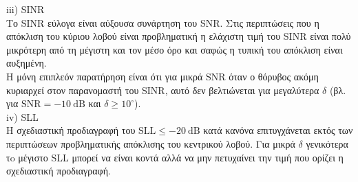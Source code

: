 \documentclass[12pt]{article} \usepackage{mathtools}
\begin{document}
iii) SINR \\
Το SINR εύλογα είναι αύξουσα συνάρτηση του SNR. Στις περιπτώσεις που η απόκλιση του κύριου λοβού είναι προβληματική η ελάχιστη τιμή του SINR είναι πολύ μικρότερη από τη μέγιστη και τον μέσο όρο και σαφώς η τυπική του απόκλιση είναι αυξημένη. \\
Η μόνη επιπλεόν παρατήρηση είναι ότι για μικρά SNR όταν ο θόρυβος ακόμη κυριαρχεί στον παρανομαστή του SINR, αυτό δεν βελτιώνεται για μεγαλύτερα $\delta$ (βλ. για $\text{SNR} = \SI{-10}{\dB}$ και $\delta \geq 10^\circ$). \\

iv) SLL \\
Η σχεδιαστική προδιαγραφή του $\text{SLL} \leq \SI{-20}{\dB}$ κατά κανόνα επιτυγχάνεται εκτός των περιπτώσεων προβληματικής απόκλισης του κεντρικού λοβού. Για μικρά $\delta$ γενικότερα τo μέγιστο SLL μπορεί να είναι κοντά αλλά να μην πετυχαίνει την τιμή που ορίζει η σχεδιαστική προδιαγραφή.
\end{document}
